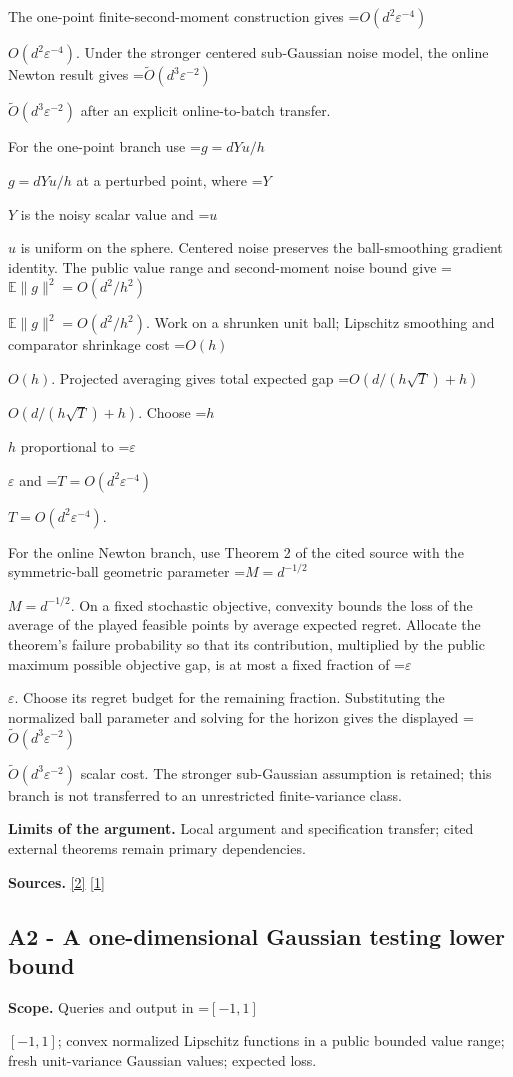 \documentclass[10pt,a4paper]{article}
\newcommand{\AtlasMath}[1]{\par\begingroup\centering\setbox0=\hbox{$\displaystyle #1$}\ifdim\wd0>1.4\linewidth\typeout{ATLAS WIDE FORMULA: \the\wd0}\fi\ifdim\wd0>\linewidth\resizebox{\linewidth}{!}{\box0}\else\box0\fi\par\endgroup}
\newcommand{\AtlasInlineMath}[1]{\begingroup\setbox0=\hbox{$#1$}\ifdim\wd0>.4\linewidth\endgroup\AtlasMath{#1}\else\endgroup$#1$\fi}
\begin{document}
The one-point finite-second-moment construction gives \AtlasInlineMath{O(d^2\varepsilon^{-4})}. Under the stronger centered sub-Gaussian noise model, the online Newton result gives \AtlasInlineMath{\widetilde O(d^3\varepsilon^{-2})} after an explicit online-to-batch transfer.

For the one-point branch use \AtlasInlineMath{g=dYu/h} at a perturbed point, where \AtlasInlineMath{Y} is the noisy scalar value and \AtlasInlineMath{u} is uniform on the sphere. Centered noise preserves the ball-smoothing gradient identity. The public value range and second-moment noise bound give \AtlasInlineMath{\mathbb E\|g\|^2=O(d^2/h^2)}. Work on a shrunken unit ball; Lipschitz smoothing and comparator shrinkage cost \AtlasInlineMath{O(h)}. Projected averaging gives total expected gap \AtlasInlineMath{O(d/(h\sqrt T)+h)}. Choose \AtlasInlineMath{h} proportional to \AtlasInlineMath{\varepsilon} and \AtlasInlineMath{T=O(d^2\varepsilon^{-4})}.

For the online Newton branch, use Theorem 2 of the cited source with the symmetric-ball geometric parameter \AtlasInlineMath{M=d^{-1/2}}. On a fixed stochastic objective, convexity bounds the loss of the average of the played feasible points by average expected regret. Allocate the theorem's failure probability so that its contribution, multiplied by the public maximum possible objective gap, is at most a fixed fraction of \AtlasInlineMath{\varepsilon}. Choose its regret budget for the remaining fraction. Substituting the normalized ball parameter and solving for the horizon gives the displayed \AtlasInlineMath{\widetilde O(d^3\varepsilon^{-2})} scalar cost. The stronger sub-Gaussian assumption is retained; this branch is not transferred to an unrestricted finite-variance class.

\textbf{Limits of the argument.} Local argument and specification transfer; cited external theorems remain primary dependencies.

\textbf{Sources.} \href{https://arxiv.org/abs/cs/0408007}{[2]} \href{https://arxiv.org/pdf/2406.06506}{[1]}

\subsection{A2 - A one-dimensional Gaussian testing lower bound}
\textbf{Scope.} Queries and output in \AtlasInlineMath{[-1,1]}; convex normalized Lipschitz functions in a public bounded value range; fresh unit-variance Gaussian values; expected loss.
\end{document}
